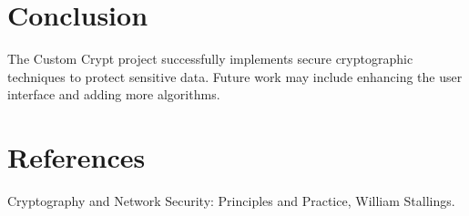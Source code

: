 \documentclass[a4paper, 12pt]{article}
\begin{document}
\section{Conclusion}
The Custom Crypt project successfully implements secure cryptographic techniques to protect sensitive data. Future work may include enhancing the user interface and adding more algorithms.

\section{References}
\begin{thebibliography}{9}
    Cryptography and Network Security: Principles and Practice, William Stallings.
\end{thebibliography}
\end{document}

